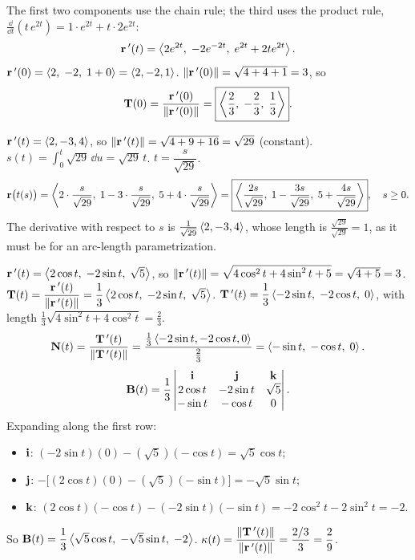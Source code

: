  The first two components use the chain rule; the third uses the
product rule, $\frac{\dd}{\dd t}\left(t\,e^{2t}\right)=1\cdot e^{2t}+t\cdot2e^{2t}$:
\[
  \mathbf{r}\,'(t)=\left\langle 2e^{2t},\;-2e^{-2t},\;e^{2t}+2te^{2t} \right\rangle.
\]
 $\mathbf{r}\,'(0)=\left\langle 2,\;-2,\;1+0 \right\rangle=\left\langle 2,-2,1 \right\rangle$.
 $\lVert\mathbf{r}\,'(0)\rVert=\sqrt{4+4+1}=3$, so
\[
  \mathbf{T}(0)=\frac{\mathbf{r}\,'(0)}{\lVert\mathbf{r}\,'(0)\rVert}=\boxed{\left\langle \frac23,\;-\frac23,\;\frac13 \right\rangle}.
\]

 $\mathbf{r}\,'(t)=\left\langle 2,-3,4 \right\rangle$, so $\lVert\mathbf{r}\,'(t)\rVert=\sqrt{4+9+16}=\sqrt{29}$ (constant).
 $s(t)=\displaystyle\int_0^t\sqrt{29}\,\dd u=\sqrt{29}\,t$.
 $t=\dfrac{s}{\sqrt{29}}$.
\[
  \mathbf{r}\big(t(s)\big)=\left\langle 2\cdot\frac{s}{\sqrt{29}},\;1-3\cdot\frac{s}{\sqrt{29}},\;5+4\cdot\frac{s}{\sqrt{29}} \right\rangle
  =\boxed{\left\langle \frac{2s}{\sqrt{29}},\;1-\frac{3s}{\sqrt{29}},\;5+\frac{4s}{\sqrt{29}} \right\rangle},\quad s\ge0 .
\]
 The derivative with respect to $s$ is $\frac{1}{\sqrt{29}}\left\langle 2,-3,4 \right\rangle$, whose length is
$\frac{\sqrt{29}}{\sqrt{29}}=1$, as it must be for an arc-length parametrization.\checkok

 $\mathbf{r}\,'(t)=\left\langle 2\cos t,\;-2\sin t,\;\sqrt5 \right\rangle$, so
$\lVert\mathbf{r}\,'(t)\rVert=\sqrt{4\cos^2t+4\sin^2t+5}=\sqrt{4+5}=3$.
 $\mathbf{T}(t)=\dfrac{\mathbf{r}\,'(t)}{\lVert\mathbf{r}\,'(t)\rVert}=\dfrac13\left\langle 2\cos t,\;-2\sin t,\;\sqrt5 \right\rangle$.
 $\mathbf{T}\,'(t)=\dfrac13\left\langle -2\sin t,\;-2\cos t,\;0 \right\rangle$, with length
$\frac13\sqrt{4\sin^2t+4\cos^2t}=\frac23$.
\[
  \mathbf{N}(t)=\frac{\mathbf{T}\,'(t)}{\lVert\mathbf{T}\,'(t)\rVert}=\frac{\frac13\left\langle -2\sin t,-2\cos t,0 \right\rangle}{\frac23}=\left\langle -\sin t,\;-\cos t,\;0 \right\rangle.
\]
\[
  \mathbf{B}(t)=\frac13\begin{vmatrix}\mathbf{i}&\mathbf{j}&\mathbf{k}\\2\cos t&-2\sin t&\sqrt5\\-\sin t&-\cos t&0\end{vmatrix}.
\]
Expanding along the first row:
\begin{itemize}
\item $\mathbf{i}$: $(-2\sin t)(0)-(\sqrt5)(-\cos t)=\sqrt5\cos t$;
\item $\mathbf{j}$: $-\big[(2\cos t)(0)-(\sqrt5)(-\sin t)\big]=-\sqrt5\sin t$;
\item $\mathbf{k}$: $(2\cos t)(-\cos t)-(-2\sin t)(-\sin t)=-2\cos^2t-2\sin^2t=-2$.
\end{itemize}
So $\mathbf{B}(t)=\dfrac13\left\langle \sqrt5\cos t,\;-\sqrt5\sin t,\;-2 \right\rangle$.
 $\kappa(t)=\dfrac{\lVert\mathbf{T}\,'(t)\rVert}{\lVert\mathbf{r}\,'(t)\rVert}=\dfrac{2/3}{3}=\dfrac29$.

